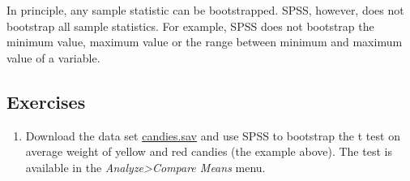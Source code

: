 \documentclass[a4paper]{book}
\providecommand{\tightlist}{%
  \setlength{\itemsep}{0pt}\setlength{\parskip}{0pt}}
\theoremstyle{definition}
\theoremstyle{definition}
\theoremstyle{definition}
\theoremstyle{remark}
\begin{document}
In principle, any sample statistic can be bootstrapped. SPSS, however,
does not bootstrap all sample statistics. For example, SPSS does not
bootstrap the minimum value, maximum value or the range between minimum
and maximum value of a variable.

\subsection{Exercises}\label{exercises}

\begin{enumerate}
\def\labelenumi{\arabic{enumi}.}
\tightlist
\item
  Download the data set
  \href{http://82.196.4.233:3838/data/candies.sav}{candies.sav} and use
  SPSS to bootstrap the t test on average weight of yellow and red
  candies (the example above). The test is available in the
  \emph{Analyze\textgreater{}Compare Means} menu.
\end{enumerate}
\end{document}
